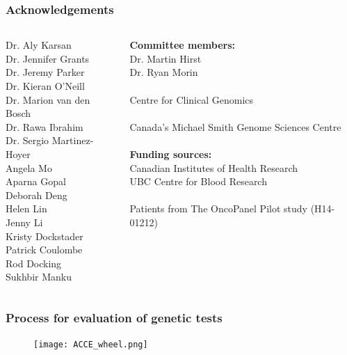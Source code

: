 \documentclass{beamer}
\begin{document}
\begin{frame}
\frametitle{Acknowledgements}
\begin{columns}[T] %
\begin{column}{.48\textwidth}
\small
Dr. Aly Karsan \\
Dr. Jennifer Grants \\
Dr. Jeremy Parker \\
Dr. Kieran O'Neill \\
Dr. Marion van den Bosch \\
Dr. Rawa Ibrahim \\
Dr. Sergio Martinez-Hoyer \\
Angela Mo \\
Aparna Gopal \\
Deborah Deng \\
Helen Lin \\
Jenny Li \\
Kristy Dockstader \\
Patrick Coulombe \\
Rod Docking \\
Sukhbir Manku
\end{column}%
\hfill%
\begin{column}{.48\textwidth}
\small
\textbf{Committee members:} \\
Dr. Martin Hirst \\
Dr. Ryan Morin
\\~\\
Centre for Clinical Genomics
\\~\\
Canada's Michael Smith Genome Sciences Centre
\\~\\
\textbf{Funding sources:} \\
Canadian Institutes of Health Research \\
UBC Centre for Blood Research
\\~\\
Patients from The OncoPanel Pilot study (H14-01212)
\end{column}%
\end{columns}
\end{frame}

\begin{frame}
\frametitle{Process for evaluation of genetic tests}
\begin{figure}[t]
    \texttt{[image: ACCE\_wheel.png]}
\end{figure}
\end{frame}
\end{document}
